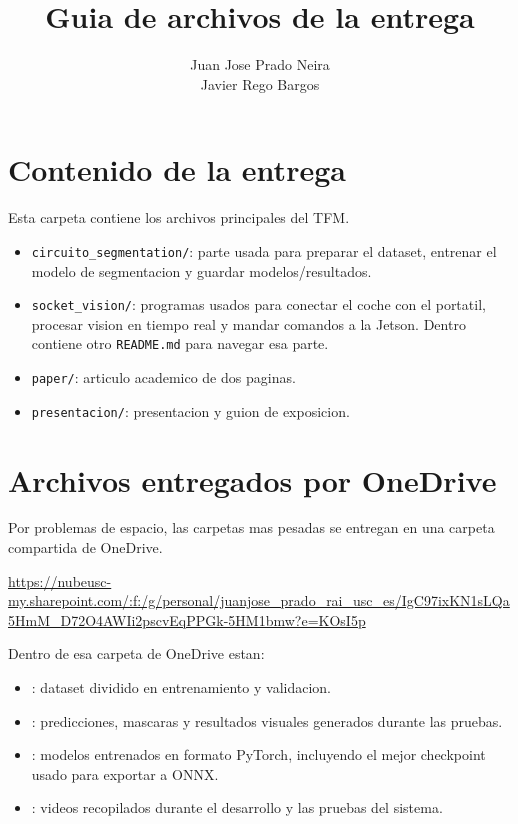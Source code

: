 \documentclass[a4paper,11pt]{article}
\title{Guia de archivos de la entrega}
\author{Juan Jose Prado Neira \\ Javier Rego Bargos}
\date{}
\begin{document}
\maketitle

\section*{Contenido de la entrega}

Esta carpeta contiene los archivos principales del TFM.

\begin{itemize}
    \item \texttt{circuito\_segmentation/}: parte usada para preparar el dataset,
    entrenar el modelo de segmentacion y guardar modelos/resultados.
    \item \texttt{socket\_vision/}: programas usados para conectar el coche con el
    portatil, procesar vision en tiempo real y mandar comandos a la Jetson.
    Dentro contiene otro \texttt{README.md} para navegar esa parte.
    \item \texttt{paper/}: articulo academico de dos paginas.
    \item \texttt{presentacion/}: presentacion y guion de exposicion.
\end{itemize}

\section*{Archivos entregados por OneDrive}

Por problemas de espacio, las carpetas mas pesadas se entregan en una carpeta
compartida de OneDrive.

\begin{center}
\url{https://nubeusc-my.sharepoint.com/:f:/g/personal/juanjose_prado_rai_usc_es/IgC97ixKN1sLQa5HmM_D72O4AWIi2pscvEqPPGk-5HM1bmw?e=KOsI5p}
\end{center}

Dentro de esa carpeta de OneDrive estan:

\begin{itemize}
    \item {}: dataset dividido en entrenamiento
    y validacion.
    \item {}: predicciones, mascaras y
    resultados visuales generados durante las pruebas.
    \item {}: modelos entrenados en
    formato PyTorch, incluyendo el mejor checkpoint usado para exportar a ONNX.
    \item {}: videos recopilados durante el desarrollo y las
    pruebas del sistema.
\end{itemize}
\end{document}
